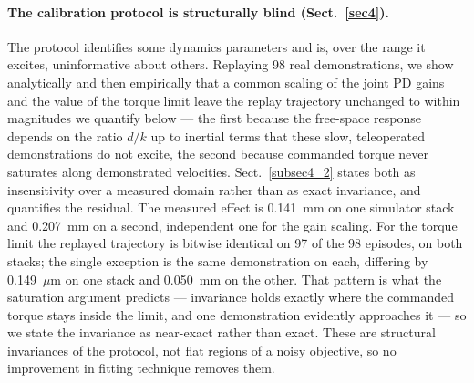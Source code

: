 \documentclass[pdflatex,iicol,sn-apa]{sn-jnl}
\theoremstyle{remark}
\begin{document}
\paragraph{The calibration protocol is structurally blind (Sect.~\ref{sec4}).}
The protocol identifies some dynamics parameters and is, over the range it excites, uninformative
about others.
Replaying 98 real demonstrations, we show analytically and then empirically that a common scaling of
the joint PD gains and the value of the torque limit leave the replay trajectory unchanged to within
magnitudes we quantify below --- the
first because the free-space response depends on the ratio $d/k$ up to inertial terms that these
slow, teleoperated demonstrations do not excite, the second because commanded
torque never saturates along demonstrated velocities. Sect.~\ref{subsec4_2} states both as
insensitivity over a measured domain rather than as exact invariance, and quantifies the residual. The measured effect is 0.141~mm on one
simulator stack and 0.207~mm on a second, independent one for the gain scaling. For the torque limit
the replayed trajectory is bitwise identical on 97 of the 98 episodes, on both stacks; the single
exception is the same demonstration on each, differing by 0.149~$\mu$m on one stack and 0.050~mm on
the other. That pattern is what the saturation argument predicts --- invariance holds exactly where
the commanded torque stays inside the limit, and one demonstration evidently approaches it --- so we
state the invariance as near-exact rather than exact. These are structural invariances of the
protocol, not flat regions of a noisy objective, so no improvement in fitting technique removes
them.
\end{document}
